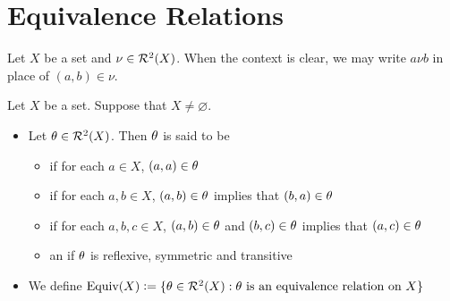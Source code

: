 \documentclass{book}
\begin{document}
	
	
	
	
	
	
	
	
	
	
	
	
	
	
	
	
	
	
	
	
	
	
	
	
	
	
	
	
	
	
	
	
	
	
	
	
	
	
	
	
	
	
	
	
	
	
	
	
	
	
	
	
	
	
	
	
	\section{Equivalence Relations}
	
	\begin{note}
		Let $X$ be a set and $\nu \in \mathcal{R}^2(X)$. When the context is clear, we may write $a \nu b$ in place of $(a,b) \in \nu$.
	\end{note}
	
	\begin{defn}
		Let $X$ be a set. Suppose that $X \neq \varnothing$.
		\begin{itemize}
			\item Let $\theta \in \mathcal{R}^2(X)$. Then $\theta$ is said to be 
			\begin{itemize}
				\item {} if for each $a \in X$, $(a,a) \in \theta$
				\item {} if for each $a,b \in X$, $(a,b) \in \theta$ implies that $(b,a) \in \theta $
				\item {} if for each $a,b,c \in X$, $(a,b) \in \theta$ and $(b,c) \in \theta$ implies that $(a,c) \in \theta $
				\item an  if $\theta$ is reflexive, symmetric and transitive
			\end{itemize}
			\item We define $\operatorname*{\text{Equiv}}(X) \vcentcolon= \{\theta \in \mathcal{R}^2(X): \text{$\theta$ is an equivalence relation on $X$}\}$
		\end{itemize}
	\end{defn}
	
\end{document}
